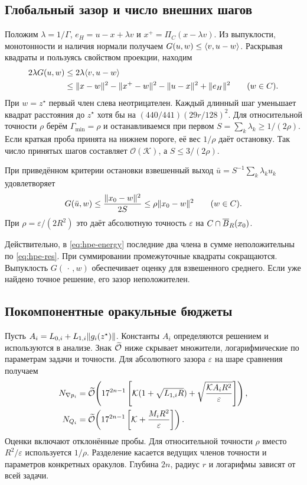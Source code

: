 

\subsection{Глобальный зазор и число внешних шагов}

Положим $\lambda=1/\Gamma$, $e_H=u-x+\lambda v$ и
$x^+=\Pi_C(x-\lambda v)$. Из выпуклости, монотонности и
наличия нормали получаем $G(u,w)\le\langle v,u-w\rangle$.
Раскрывая квадраты и пользуясь свойством проекции, находим
\begin{align}
 2\lambda G(u,w)
 &\le 2\lambda\langle v,u-w\rangle \notag\\
 &\le \lVert x-w\rVert^2-\lVert x^+-w\rVert^2-\lVert u-x\rVert^2+\lVert e_H\rVert^2
 \qquad(w\in C).
 \label{eq:hpe-energy}
\end{align}
При $w=z^\star$ первый член слева неотрицателен.
Каждый длинный шаг уменьшает квадрат расстояния до $z^\star$
хотя бы на $(440/441)(29r/128)^2$. Для относительной
точности $\rho$ берём $\Gamma_{\min}=\rho$ и останавливаемся
при первом $S=\sum_k\lambda_k\ge 1/(2\rho)$. Если краткая
проба принята на нижнем пороге, её вес $1/\rho$ даёт остановку.
Так число принятых шагов составляет $\mathcal O(\mathcal K)$,
а $S\le3/(2\rho)$.

\begin{theorem}\label{thm:hpe}
При приведённом критерии остановки взвешенный выход
$\bar u=S^{-1}\sum_k\lambda_k u_k$ удовлетворяет
\[
 G(\bar u,w)\le\frac{\lVert x_0-w\rVert^2}{2S}
             \le \rho\lVert x_0-w\rVert^2\qquad(w\in C).
\]
При $\rho=\varepsilon/(2R^2)$ это даёт абсолютную точность
$\varepsilon$ на $C\cap\overline B_R(x_0)$.
\end{theorem}

Действительно, в \eqref{eq:hpe-energy} последние два члена в сумме
неположительны по \eqref{eq:hpe-res}. При суммировании промежуточные
квадраты сокращаются. Выпуклость $G(\,\cdot\,,w)$ обеспечивает
оценку для взвешенного среднего. Если уже найдено точное решение,
его зазор неположителен.

\subsection{Покомпонентные оракульные бюджеты}\label{sec:hpe-cost}

Пусть $A_i=L_{0,i}+L_{1,i}\lVert g_i(z^\star)\rVert$.
Константы $A_i$ определяются решением и используются в анализе.
Знак $\widetilde{\mathcal O}$ ниже скрывает множители, логарифмические по параметрам
задачи и точности. Для абсолютного зазора $\varepsilon$ на шаре
сравнения получаем
\begin{align}
 N_{\nabla p_i}
 &=
 \widetilde{\mathcal O}\!\left(17^{2n-1}\left[
       \mathcal K(1+\sqrt{L_{1,i}R})
       +\sqrt{\frac{\mathcal K A_iR^2}{\varepsilon}}\right]\right),
       \label{eq:hpe-grad}\\
 N_{Q_i}
 &=
 \widetilde{\mathcal O}\!\left(17^{2n-1}\left[
       \mathcal K+\frac{M_iR^2}{\varepsilon}\right]\right).
       \label{eq:hpe-op}
\end{align}
Оценки включают отклонённые пробы. Для относительной точности
$\rho$ вместо $R^2/\varepsilon$ используется $1/\rho$.
Разделение касается ведущих членов точности и параметров конкретных
оракулов. Глубина $2n$, радиус $r$ и логарифмы зависят от всей задачи.

